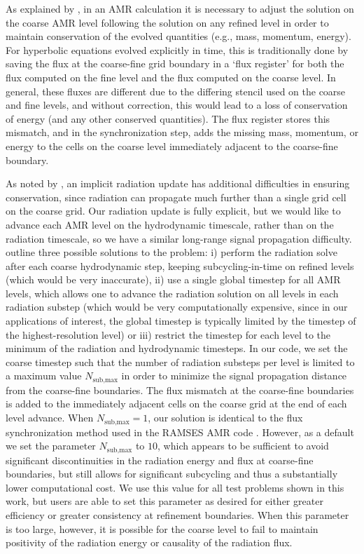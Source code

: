 \documentclass[fleqn,usenatbib]{mnras}
\begin{document}
As explained by \cite{Berger:1989}, in an AMR calculation it is necessary to adjust the solution on the coarse AMR level following the solution on any refined level in order to maintain conservation of the evolved quantities (e.g., mass, momentum, energy). For hyperbolic equations evolved explicitly in time, this is traditionally done by saving the flux at the coarse-fine grid boundary in a `flux register' for both the flux computed on the fine level and the flux computed on the coarse level. In general, these fluxes are different due to the differing stencil used on the coarse and fine levels, and without correction, this would lead to a loss of conservation of energy (and any other conserved quantities). The flux register stores this mismatch, and in the synchronization step, adds the missing mass, momentum, or energy to the cells on the coarse level immediately adjacent to the coarse-fine boundary.

As noted by \cite{Howell_2003}, an implicit radiation update has additional difficulties in ensuring conservation, since radiation can propagate much further than a single grid cell on the coarse grid. Our radiation update is fully explicit, but we would like to advance each AMR level on the hydrodynamic timescale, rather than on the radiation timescale, so we have a similar long-range signal propagation difficulty. \cite{Rosdahl_2013} outline three possible solutions to the problem: i) perform the radiation solve after each coarse hydrodynamic step, keeping subcycling-in-time on refined levels (which would be very inaccurate), ii) use a single global timestep for all AMR levels, which allows one to advance the radiation solution on all levels in each radiation substep (which would be very computationally expensive, since in our applications of interest, the global timestep is typically limited by the timestep of the highest-resolution level) or iii) restrict the timestep for each level to the minimum of the radiation and hydrodynamic timesteps. In our code, we set the coarse timestep such that the number of radiation substeps per level is limited to a maximum value $N_{\text{sub,max}}$ in order to minimize the signal propagation distance from the coarse-fine boundaries. The flux mismatch at the coarse-fine boundaries is added to the immediately adjacent cells on the coarse grid at the end of each level advance. When $N_{\text{sub,max}} = 1$, our solution is identical to the flux synchronization method used in the \textsc{RAMSES} AMR code \citep{Rosdahl_2013}. However, as a default we set the parameter $N_{\text{sub,max}}$ to $10$, which appears to be sufficient to avoid significant discontinuities in the radiation energy and flux at coarse-fine boundaries, but still allows for significant subcycling and thus a substantially lower computational cost. We use this value for all test problems shown in this work, but users are able to set this parameter as desired for either greater efficiency or greater consistency at refinement boundaries. When this parameter is too large, however, it is possible for the coarse level to fail to maintain positivity of the radiation energy or causality of the radiation flux.
\end{document}
